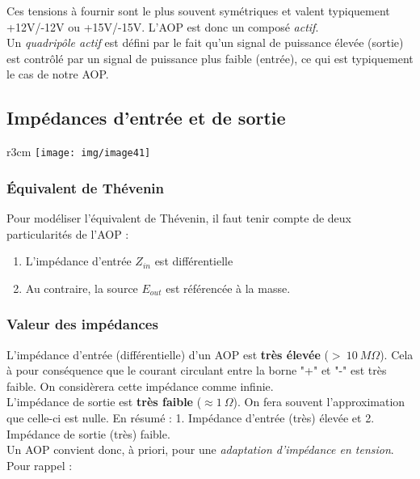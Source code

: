 Ces tensions à fournir sont le plus souvent symétriques et valent typiquement +12V/-12V ou +15V/-15V. L'AOP est donc un composé \textit{actif}.\\

Un \textit{quadripôle actif} est défini par le fait qu'un signal de puissance élevée (sortie) est contrôlé par un signal de puissance plus faible (entrée), ce qui est typiquement le cas de notre AOP.\\




\newpage

\subsection{Impédances d'entrée et de sortie}\begin{wrapfigure}[1]{r}{3cm}
\texttt{[image: img/image41]}
\end{wrapfigure}
\subsubsection{Équivalent de Thévenin}

Pour modéliser l'équivalent de Thévenin, il faut tenir compte de deux particularités de l'AOP :
\begin{enumerate}
	\item L'impédance d'entrée $Z_{in}$ est différentielle
	\item Au contraire, la source $E_{out}$ est référencée à la masse.
\end{enumerate}


\subsubsection{Valeur des impédances}
L'impédance d'entrée (différentielle) d'un AOP est \textbf{très élevée} ($>\ 10\ M\Omega$). Cela à pour conséquence que le courant circulant entre la borne "+" et "-" est très faible. On considèrera cette impédance comme infinie.\\
L'impédance de sortie est \textbf{très faible} ($\approx 1\ \Omega$). On fera souvent l'approximation que celle-ci est nulle. En résumé : 1. Impédance d'entrée (très) élevée et 2. Impédance de sortie (très) faible.\\
Un AOP convient donc, à priori, pour une \textit{adaptation d'impédance en tension}. Pour rappel :\\

